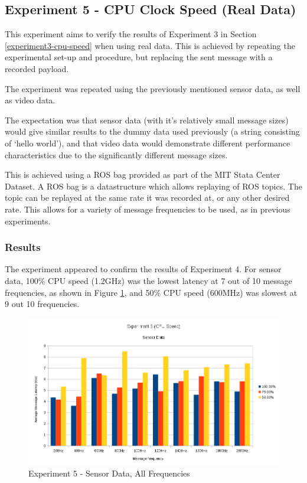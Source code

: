 \documentclass[../dissertation.tex]{subfiles}
\begin{document}
\subsection{Experiment 5 - CPU Clock Speed (Real Data)}

This experiment aims to verify the results of Experiment 3 in Section \ref{experiment3-cpu-speed} when using real data. This is achieved by repeating the experimental set-up and procedure, but replacing the sent message with a recorded payload.

The experiment was repeated using the previously mentioned sensor data, as well as video data.

The expectation was that sensor data (with it's relatively small message sizes) would give similar results to the dummy data used previously (a string consisting of `hello world'), and that video data would demonstrate different performance characteristics due to the significantly different message sizes.

This is achieved using a ROS bag provided as part of the MIT Stata Center Dataset. A ROS bag is a datastructure which allows replaying of ROS topics. The topic can be replayed at the same rate it was recorded at, or any other desired rate. This allows for a variety of message frequencies to be used, as in previous experiments.

\subsubsection{Results}

The experiment appeared to confirm the results of Experiment 4. For sensor data, 100\% CPU speed (1.2GHz) was the lowest latency at 7 out of 10 message frequencies, as shown in Figure \ref{exp5-sensor-means-all-freq}, and 50\% CPU speed (600MHz) was slowest at 9 out 10 frequencies.

\begin{figure}[H]
\centering
\includegraphics[width=\textwidth]{images/experiment5/sensor_data_all_freqs.png}
\caption{Experiment 5 - Sensor Data, All Frequencies}
\label{exp5-sensor-means-all-freq}
\end{figure}
\end{document}
